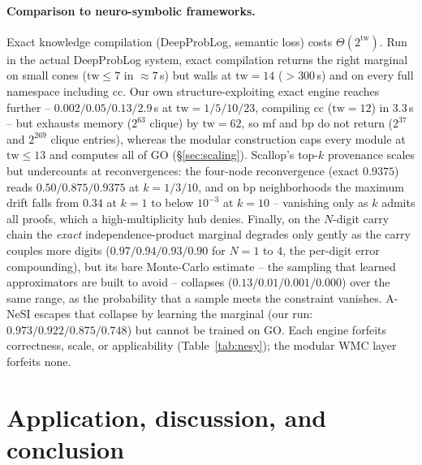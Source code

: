 \documentclass[anon]{nesy2026}
\newcommand{\tw}{\ensuremath{\mathrm{tw}}}
\begin{document}
\paragraph{Comparison to neuro-symbolic frameworks.}
Exact knowledge compilation (DeepProbLog, semantic loss) costs $\Theta(2^{\tw})$. Run in the actual
DeepProbLog system, exact compilation returns the right marginal on small cones ($\tw{\le}7$ in
${\approx}7$\,s) but walls at $\tw{=}14$ ($>300$\,s) and on every full namespace including cc.
Our own structure-exploiting exact engine reaches further -- $0.002/0.05/0.13/2.9$\,s at
$\tw{=}1/5/10/23$, compiling cc ($\tw{=}12$) in $3.3$\,s -- but exhausts memory ($2^{63}$ clique) by
$\tw{=}62$, so mf and bp do not return ($2^{37}$ and $2^{269}$ clique entries), whereas the modular
construction caps every module at $\tw{\le}13$ and computes all of GO (\S\ref{sec:scaling}). Scallop's top-$k$
provenance scales but undercounts at reconvergences: the four-node reconvergence (exact
$0.9375$) reads $0.50/0.875/0.9375$ at $k{=}1/3/10$, and on bp neighborhoods the maximum drift
falls from $0.34$ at $k{=}1$ to below $10^{-3}$ at $k{=}10$ -- vanishing only as $k$ admits all
proofs, which a high-multiplicity hub denies. Finally, on the $N$-digit carry chain the
\emph{exact} independence-product marginal degrades only gently as the carry couples more
digits ($0.97/0.94/0.93/0.90$ for $N{=}1$ to $4$, the per-digit error compounding), but its
bare Monte-Carlo estimate -- the sampling that learned approximators are built to avoid -- collapses
($0.13/0.01/0.001/0.000$) over the same range, as the probability that a sample meets the
constraint vanishes. A-NeSI escapes that collapse by learning the marginal (our run:
$0.973/0.922/0.875/0.748$) but cannot be trained on GO. Each engine forfeits correctness, scale, or
applicability (Table~\ref{tab:nesy}); the modular WMC layer forfeits none.

\section{Application, discussion, and conclusion}
\end{document}
